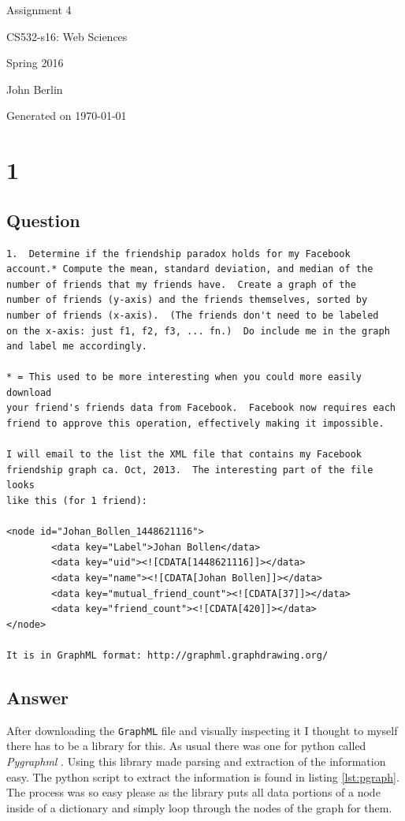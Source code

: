 \documentclass[letterpaper,10pt]{article}
\begin{document}
 

\begin{titlepage}

\begin{center}

\Huge{Assignment 4}

\Large{CS532-s16:  Web Sciences}

\Large{Spring 2016}

\Large{John Berlin}

\Large Generated on \today

\end{center}

\end{titlepage}
\newpage
\section*{1}
\subsection*{Question}
\begin{verbatim}
1.  Determine if the friendship paradox holds for my Facebook
account.* Compute the mean, standard deviation, and median of the
number of friends that my friends have.  Create a graph of the
number of friends (y-axis) and the friends themselves, sorted by
number of friends (x-axis).  (The friends don't need to be labeled
on the x-axis: just f1, f2, f3, ... fn.)  Do include me in the graph
and label me accordingly.

* = This used to be more interesting when you could more easily download
your friend's friends data from Facebook.  Facebook now requires each
friend to approve this operation, effectively making it impossible.

I will email to the list the XML file that contains my Facebook
friendship graph ca. Oct, 2013.  The interesting part of the file looks
like this (for 1 friend):

<node id="Johan_Bollen_1448621116">
        <data key="Label">Johan Bollen</data>
        <data key="uid"><![CDATA[1448621116]]></data>
        <data key="name"><![CDATA[Johan Bollen]]></data>
        <data key="mutual_friend_count"><![CDATA[37]]></data>
        <data key="friend_count"><![CDATA[420]]></data>
</node>

It is in GraphML format: http://graphml.graphdrawing.org/
\end{verbatim}
\subsection*{Answer}
After downloading the \verb+GraphML+ file and visually inspecting it I thought to myself there has to be a library for this. As usual there was one for python called \emph{Pygraphml} \cite{pygraphml}. Using this library made parsing and extraction of the information easy. The python script to extract the information is found in listing \ref{lst:pgraph}. The process was so easy please as the library puts all data portions of a node inside of a dictionary and simply loop through the nodes of the graph for them.
\end{document}
